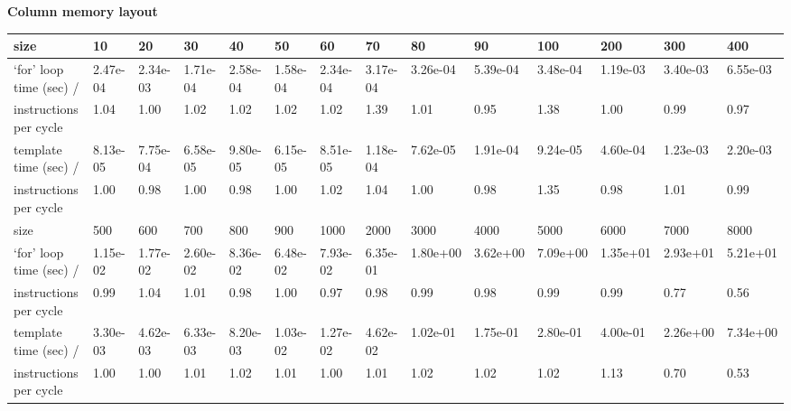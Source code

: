 \documentclass[a4paper,11pt]{article}
\begin{document}
\vspace{1cm}
\bf
Column memory layout\\
\rm




\begin{tabular}{|l|l|l|l|l|l|l|l|l|l|l|l|l|l|}
\hline
size & 10 & 20 & 30 & 40 & 50 & 60 & 70 & 80 & 90 & 100 & 200 & 300 & 400 \\
\hline
`for' loop time (sec) / & 2.47e-04 & 2.34e-03 & 1.71e-04 & 2.58e-04 & 1.58e-04 & 2.34e-04 & 3.17e-04 & 3.26e-04 & 5.39e-04 & 3.48e-04 & 1.19e-03 & 3.40e-03 & 6.55e-03 \\
instructions per cycle & 1.04 & 1.00 & 1.02 & 1.02 & 1.02 & 1.02 & 1.39 & 1.01 & 0.95 & 1.38 & 1.00 & 0.99 & 0.97 \\
\hline
template time (sec) / & 8.13e-05 & 7.75e-04 & 6.58e-05 & 9.80e-05 & 6.15e-05 & 8.51e-05 & 1.18e-04 & 7.62e-05 & 1.91e-04 & 9.24e-05 & 4.60e-04 & 1.23e-03 & 2.20e-03 \\
instructions per cycle & 1.00 & 0.98 & 1.00 & 0.98 & 1.00 & 1.02 & 1.04 & 1.00 & 0.98 & 1.35 & 0.98 & 1.01 & 0.99 \\ 
\hline
\hline
size & 500 & 600 & 700 & 800 & 900 & 1000 & 2000 & 3000 & 4000 & 5000 & 6000 & 7000 & 8000\\
\hline
`for' loop time (sec) / & 1.15e-02 & 1.77e-02 & 2.60e-02 & 8.36e-02 & 6.48e-02 & 7.93e-02 & 6.35e-01 & 1.80e+00 & 3.62e+00 & 7.09e+00 & 1.35e+01 & 2.93e+01 & 5.21e+01\\
instructions per cycle & 0.99 & 1.04 & 1.01 & 0.98 & 1.00 & 0.97 & 0.98 & 0.99 & 0.98 & 0.99 & 0.99 & 0.77 & 0.56\\
\hline
template time (sec) / & 3.30e-03 & 4.62e-03 & 6.33e-03 & 8.20e-03 & 1.03e-02 & 1.27e-02 & 4.62e-02 & 1.02e-01 & 1.75e-01 & 2.80e-01 & 4.00e-01 & 2.26e+00 & 7.34e+00\\
instructions per cycle & 1.00 & 1.00 & 1.01 & 1.02 & 1.01 & 1.00 & 1.01 & 1.02 & 1.02 & 1.02 & 1.13 & 0.70 & 0.53\\
\hline
\end{tabular}
\end{document}
